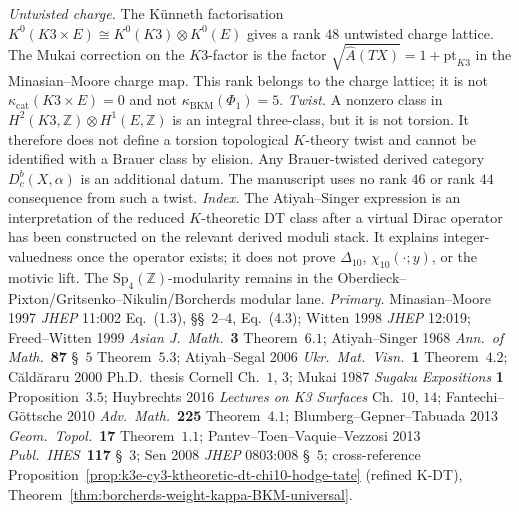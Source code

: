 \begin{remark}
\label{rem:k3e-cy3-witten-moore}

\emph{Untwisted charge.} The K\"unneth factorisation
\(K^0(K3\times E)\cong K^0(K3)\otimes K^0(E)\) gives a rank \(48\)
untwisted charge lattice. The Mukai correction on the \(K3\)-factor is
the factor \(\sqrt{\hat A(TX)}=1+\mathrm{pt}_{K3}\) in the
Minasian--Moore charge map. This rank belongs to the charge lattice; it
is not \(\kappa_{\mathrm{cat}}(K3\times E)=0\) and not
\(\kappa_{\mathrm{BKM}}(\Phi_1)=5\).
\emph{Twist.} A nonzero class in
\(H^2(K3,\mathbb Z)\otimes H^1(E,\mathbb Z)\) is an integral
three-class, but it is not torsion. It therefore does not define a
torsion topological \(K\)-theory twist and cannot be identified with a
Brauer class by elision. Any Brauer-twisted derived category
\(D^b_c(X,\alpha)\) is an additional datum. The manuscript uses no rank
\(46\) or rank \(44\) consequence from such a twist.
\emph{Index.} The Atiyah--Singer expression is an interpretation of the
reduced \(K\)-theoretic DT class after a virtual Dirac operator has been
constructed on the relevant derived moduli stack. It explains
integer-valuedness once the operator exists; it does not prove
\(\Delta_{10}\), \(\chi_{10}(\cdot;y)\), or the motivic lift. The
\(\mathrm{Sp}_4(\mathbb Z)\)-modularity remains in the
Oberdieck--Pixton/Gritsenko--Nikulin/Borcherds modular lane.
\emph{Primary.} Minasian--Moore 1997 \emph{JHEP} 11:002 Eq.~(1.3), \S\S~$2$--$4$, Eq.~(4.3); Witten 1998 \emph{JHEP} 12:019; Freed--Witten 1999 \emph{Asian J.\ Math.}~\textbf{3} Theorem~$6.1$; Atiyah--Singer 1968 \emph{Ann.\ of Math.}~\textbf{87} \S~$5$ Theorem~$5.3$; Atiyah--Segal 2006 \emph{Ukr.\ Mat.\ Visn.}~\textbf{1} Theorem~$4.2$; C\u{a}ld\u{a}raru 2000 Ph.D.\ thesis Cornell Ch.~$1$, $3$; Mukai 1987 \emph{Sugaku Expositions} \textbf{1} Proposition~$3.5$; Huybrechts 2016 \emph{Lectures on K3 Surfaces} Ch.~$10$, $14$; Fantechi--G\"ottsche 2010 \emph{Adv.\ Math.}~\textbf{225} Theorem~$4.1$; Blumberg--Gepner--Tabuada 2013 \emph{Geom.\ Topol.}~\textbf{17} Theorem~$1.1$; Pantev--Toen--Vaquie--Vezzosi 2013 \emph{Publ.\ IHES}~\textbf{117} \S~$3$; Sen 2008 \emph{JHEP} 0803:008 \S~$5$; cross-reference Proposition~\ref{prop:k3e-cy3-ktheoretic-dt-chi10-hodge-tate} (refined K-DT), Theorem~\ref{thm:borcherds-weight-kappa-BKM-universal}.
\end{remark}


